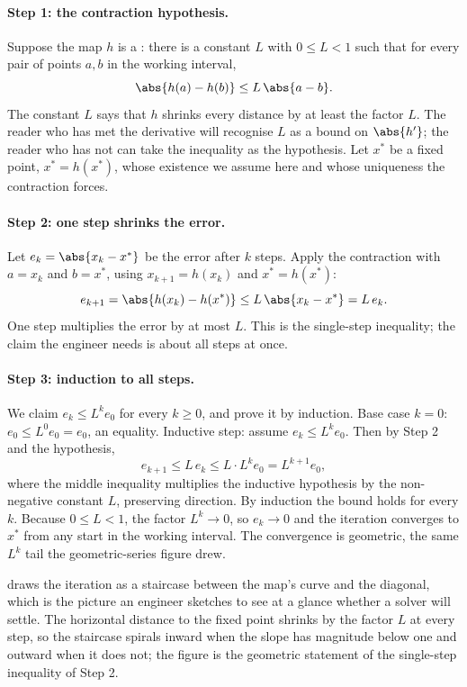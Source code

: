 \paragraph{Step 1: the contraction hypothesis.} Suppose the map $h$ is a
: there is a constant $L$ with $0 \leq L < 1$ such
that for every pair of points $a, b$ in the working interval,
\[
\abs{h(a) - h(b)} \leq L \, \abs{a - b}.
\]
The constant $L$ says that $h$ shrinks every distance by at least the
factor $L$. The reader who has met the derivative will recognise $L$ as a
bound on $\abs{h'}$; the reader who has not can take the inequality as
the hypothesis. Let $x^{\ast}$ be a fixed point, $x^{\ast} =
h(x^{\ast})$, whose existence we assume here and whose uniqueness the
contraction forces.

\paragraph{Step 2: one step shrinks the error.} Let $e_{k} = \abs{x_{k} -
x^{\ast}}$ be the error after $k$ steps. Apply the contraction with $a =
x_{k}$ and $b = x^{\ast}$, using $x_{k+1} = h(x_{k})$ and $x^{\ast} =
h(x^{\ast})$:
\[
e_{k+1} = \abs{h(x_{k}) - h(x^{\ast})} \leq L \, \abs{x_{k} - x^{\ast}}
= L \, e_{k}.
\]
One step multiplies the error by at most $L$. This is the single-step
inequality; the claim the engineer needs is about all steps at once.

\paragraph{Step 3: induction to all steps.} We claim $e_{k} \leq L^{k}
e_{0}$ for every $k \geq 0$, and prove it by induction. Base case $k = 0$:
$e_{0} \leq L^{0} e_{0} = e_{0}$, an equality. Inductive step: assume
$e_{k} \leq L^{k} e_{0}$. Then by Step 2 and the hypothesis,
\[
e_{k+1} \leq L \, e_{k} \leq L \cdot L^{k} e_{0} = L^{k+1} e_{0},
\]
where the middle inequality multiplies the inductive hypothesis by the
non-negative constant $L$, preserving direction. By induction the bound
holds for every $k$. Because $0 \leq L < 1$, the factor $L^{k} \to 0$, so
$e_{k} \to 0$ and the iteration converges to $x^{\ast}$ from any start in
the working interval. The convergence is geometric, the same $L^{k}$ tail
the geometric-series figure drew.



 draws the iteration as a
staircase between the map's curve and the diagonal, which is the picture
an engineer sketches to see at a glance whether a solver will settle. The
horizontal distance to the fixed point shrinks by the factor $L$ at every
step, so the staircase spirals inward when the slope has magnitude below
one and outward when it does not; the figure is the geometric statement
of the single-step inequality of Step 2.


